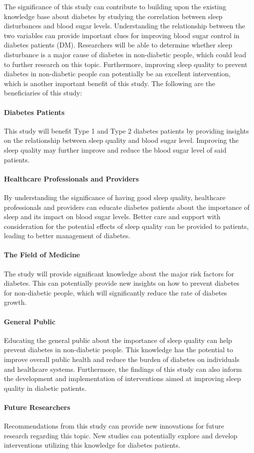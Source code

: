 
The significance of this study can contribute to building upon the existing
knowledge base about diabetes by studying the correlation between sleep
disturbances and blood sugar levels. Understanding the relationship between the
two variables can provide important clues for improving blood sugar control in
diabetes patients (DM). Researchers will be able to determine whether sleep
disturbance is a major cause of diabetes in non-diabetic people, which could
lead to further research on this topic. Furthermore, improving sleep quality to
prevent diabetes in non-diabetic people can potentially be an excellent
intervention, which is another important benefit of this study. The following
are the beneficiaries of this study:

\paragraph{Diabetes Patients} This study will benefit Type 1 and Type 2 diabetes
patients by providing insights on the relationship between sleep quality and
blood sugar level. Improving the sleep quality may further improve and reduce
the blood sugar level of said patients.

\paragraph{Healthcare Professionals and Providers} By understanding the
significance of having good sleep quality, healthcare professionals and
providers can educate diabetes patients about the importance of sleep and its
impact on blood sugar levels. Better care and support with consideration for the
potential effects of sleep quality can be provided to patients, leading to
better management of diabetes.

\paragraph{The Field of Medicine} The study will provide significant knowledge
about the major risk factors for diabetes. This can potentially provide new
insights on how to prevent diabetes for non-diabetic people, which will
significantly reduce the rate of diabetes growth.

\paragraph{General Public} Educating the general public about the importance of
sleep quality can help prevent diabetes in non-diabetic people. This knowledge
has the potential to improve overall public health and reduce the burden of
diabetes on individuals and healthcare systems. Furthermore, the findings of
this study can also inform the development and implementation of interventions
aimed at improving sleep quality in diabetic patients.

\paragraph{Future Researchers} Recommendations from this study can provide new
innovations for future research regarding this topic. New studies can
potentially explore and develop interventions utilizing this knowledge for
diabetes patients.
